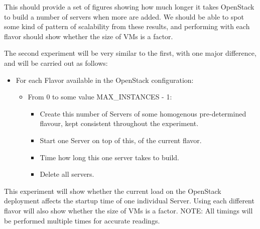This should provide a set of figures showing how much longer it takes OpenStack to build a number of servers when more are added. We should be able to spot some kind of pattern of scalability from these results, and performing with each flavor should show whether the size of VMs is a factor.  

The second experiment will be very similar to the first, with one major difference, and will be carried out as follows:
\begin{itemize}
\itemsep0em
\item For each Flavor available in the OpenStack configuration:
	\begin{itemize}
	\itemsep0em
	\item From 0 to some value MAX\_INSTANCES - 1:
		\begin{itemize}
		\itemsep0em
		\item Create this number of Servers of some homogenous pre-determined flavour, kept consistent throughout the experiment.
		\item Start one Server on top of this, of the current flavor. 
		\item Time how long this one server takes to build. 
		\item Delete all servers. 
		\end{itemize}
	\end{itemize}
\end{itemize}

This experiment will show whether the current load on the OpenStack deployment affects the startup time of one individual Server. Using each different flavor will also show whether the size of VMs is a factor.
NOTE: All timings will be performed multiple times for accurate readings.  

